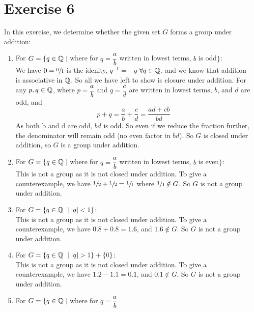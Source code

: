 \documentclass[12pt]{article}
\begin{document}
    \section*{Exercise 6}
    In this exercise, we determine whether the given set $G$ forms a group
    under addition:
    \begin{enumerate}[label=\textbf{\alph*.}]
        \item
            For $G = \{q \in \mathbb{Q} \mid$ where for $q = \dfrac{a}{b}$
            written in lowest terms, $b$ is odd$\}$: \\
            We have $0 = \sfrac{0}{1}$ is the idenity,
            $q^{-1} = -q$ $\forall q \in \mathbb{Q}$,
            and we know that addition is associative in $\mathbb{Q}$.
            So all we have left to show is closure under addition.
            For any $p, q \in \mathbb{Q}$,
            where $p = \dfrac{a}{b}$ and $q = \dfrac{c}{d}$
            are written in lowest terms, $b$, and $d$ are odd,
            and \[p + q = \dfrac{a}{b} + \dfrac{c}{d} = \dfrac{ad + cb}{bd}\]
            As both b and d are odd, $bd$ is odd.
            So even if we reduce the fraction further,
            the denominator will remain odd (no even factor in $bd$).
            So $G$ is closed under addition,
            so $G$ is a group under addition.
        \item
            For $G = \{q \in \mathbb{Q} \mid$ where for $q = \dfrac{a}{b}$
            written in lowest terms, $b$ is even$\}$: \\
            This is not a group as it is not closed under addition.
            To give a counterexample,
            we have $\sfrac{1}{2} + \sfrac{1}{2} = \sfrac{1}{1}$
            where $\sfrac{1}{1} \notin G$.
            So $G$ is not a group under addition.
        \item
            For $G = \{q \in \mathbb{Q}\ \mid |q| < 1\}$: \\
            This is not a group as it is not closed under addition.
            To give a counterexample,
            we have $0.8 + 0.8 = 1.6$, and $1.6 \notin G$.
            So $G$ is not a group under addition.
        \item
            For $G = \{q \in \mathbb{Q}\ \mid |q| > 1\} + \{0\}$: \\
            This is not a group as it is not closed under addition.
            To give a counterexample,
            we have $1.2 - 1.1 = 0.1$, and $0.1 \notin G$.
            So $G$ is not a group under addition.
        \item
            For $G = \{q \in \mathbb{Q} \mid$ where for $q = \dfrac{a}{b}$

\end{enumerate}
\end{document}
